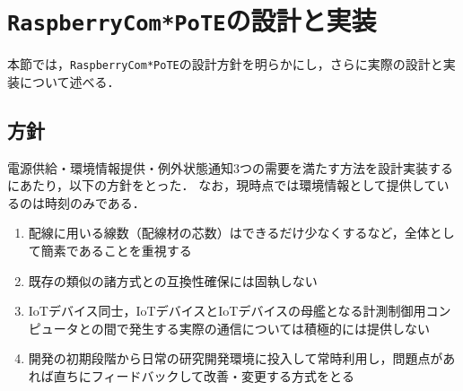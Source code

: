 

\section{{\tt Raspberry\-Com*PoTE}の設計と実装}
\vspace{-0.5zh}
\label{sec:04design_and_implementation}

本節では，{\tt Raspberry\-Com*PoTE}の設計方針を明らかにし，さらに実際の設計と実装について述べる．


\subsection{方針}
\vspace{-0.5zh}

電源供給・環境情報提供・例外状態通知3つの需要を満たす方法を設計実装するにあたり，以下の方針をとった．
なお，現時点では環境情報として提供しているのは時刻のみである．

\begin{enumerate}
\item 配線に用いる線数（配線材の芯数）はできるだけ少なくするなど，全体として簡素であることを重視する
\item 既存の類似の諸方式との互換性確保には固執しない
\item IoTデバイス同士，IoTデバイスとIoTデバイスの母艦となる計測制御用コンピュータとの間で発生する実際の通信については積極的には提供しない
\item 開発の初期段階から日常の研究開発環境に投入して常時利用し，問題点があれば直ちにフィードバックして改善・変更する方式をとる
\end{enumerate}


